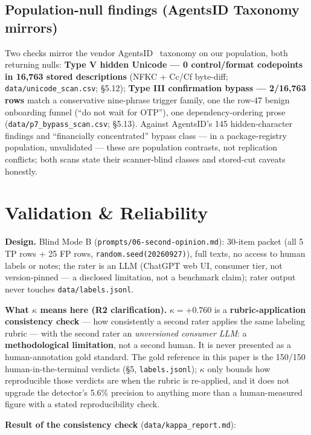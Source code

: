 \documentclass[10pt,conference]{IEEEtran}
\begin{document}
\subsection{Population-null findings (AgentsID Taxonomy mirrors)}

Two checks mirror the vendor AgentsID~\cite{agentsid} taxonomy on our population, both
returning nulls: \textbf{Type V hidden Unicode --- 0 control/format codepoints in 16,763
stored descriptions} (NFKC + Cc/Cf byte-diff; \texttt{data/unicode\_scan.csv}; \S5.12);
\textbf{Type III confirmation bypass --- 2/16,763 rows} match a conservative nine-phrase
trigger family, one the row-47 benign onboarding funnel (``do not wait for OTP''), one
dependency-ordering prose (\texttt{data/p7\_bypass\_scan.csv}; \S5.13). Against AgentsID's
145 hidden-character findings and ``financially concentrated'' bypass class --- in a
package-registry population, unvalidated --- these are population contrasts, not
replication conflicts; both scans state their scanner-blind classes and stored-cut caveats
honestly.

\section{Validation \& Reliability}

\textbf{Design.} Blind Mode B (\texttt{prompts/06-second-opinion.md}): 30-item packet
(all 5 TP rows + 25 FP rows, \texttt{random.seed(20260927)}), full texts, no access to
human labels or notes; the rater is an LLM (ChatGPT web UI, consumer tier, not
version-pinned --- a disclosed limitation, not a benchmark claim); rater output never
touches \texttt{data/labels.jsonl}.

\textbf{What $\kappa$ means here (R2 clarification).} $\kappa = +0.760$ is a
\textbf{rubric-application consistency check} --- how consistently a second rater applies
the same labeling rubric --- with the second rater an \emph{unversioned consumer LLM}: a
\textbf{methodological limitation}, not a second human. It is never presented as a
human-annotation gold standard. The gold reference in this paper is the 150/150
human-in-the-terminal verdicts (\S5, \texttt{labels.jsonl}); $\kappa$ only bounds how
reproducible those verdicts are when the rubric is re-applied, and it does not upgrade the
detector's 5.6\% precision to anything more than a human-measured figure with a stated
reproducibility check.

\textbf{Result of the consistency check} (\texttt{data/kappa\_report.md}):
\end{document}
